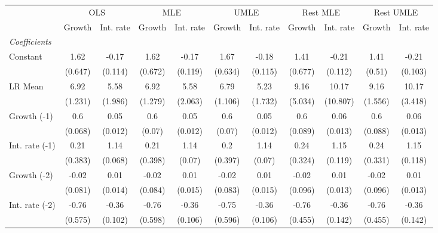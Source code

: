 \begin{table}[htbp] 
	\centering
	\begin{tabular}{@{\extracolsep{4pt}}lcccccccccc@{}}		\hline\hline
		 		 & \multicolumn{2}{c}{OLS} &\multicolumn{2}{c}{MLE} &\multicolumn{2}{c}{UMLE} &\multicolumn{2}{c}{Rest MLE} &\multicolumn{2}{c}{Rest UMLE} \\ 
 		 & Growth 	 & Int. rate 	 & Growth 	 & Int. rate 	 & Growth 	 & Int. rate 	 & Growth 	 & Int. rate 	 & Growth 	 & Int. rate\\\cline{2-3}\cline{4-5}\cline{6-7}\cline{8-9}\cline{10-11}
\rule{0pt}{4ex} 
 \emph{Coefficients} 	  		 & 		 & 		 & 		 & 		 & 		 & 		 & 		 & 		 & 		 &\\ 
\quad Constant 	 & 1.62 	 & -0.17 	 & 1.62 	 & -0.17 	 & 1.67 	 & -0.18 	 & 1.41 	 & -0.21 	 & 1.41 	 & -0.21	 \\ 
 		 & (0.647) 	 & (0.114) 	 & (0.672) 	 & (0.119) 	 & (0.634) 	 & (0.115) 	 & (0.677) 	 & (0.112) 	 & (0.51) 	 & (0.103) 	 \\ 
\quad LR Mean 	 & 6.92 	 & 5.58 	 & 6.92 	 & 5.58 	 & 6.79 	 & 5.23 	 & 9.16 	 & 10.17 	 & 9.16 	 & 10.17	 \\ 
 		 & (1.231) 	 & (1.986) 	 & (1.279) 	 & (2.063) 	 & (1.106) 	 & (1.732) 	 & (5.034) 	 & (10.807) 	 & (1.556) 	 & (3.418) 	 \\ 
\quad Growth (-1) 	 &0.6 	 & 0.05 	 & 0.6 	 & 0.05 	 & 0.6 	 & 0.05 	 & 0.6 	 & 0.06 	 & 0.6 	 & 0.06	 \\ 
 		 & (0.068) 	 & (0.012) 	 & (0.07) 	 & (0.012) 	 & (0.07) 	 & (0.012) 	 & (0.089) 	 & (0.013) 	 & (0.088) 	 & (0.013) 	 \\ 
\quad Int. rate (-1) 	 &0.21 	 & 1.14 	 & 0.21 	 & 1.14 	 & 0.2 	 & 1.14 	 & 0.24 	 & 1.15 	 & 0.24 	 & 1.15	 \\ 
 		 & (0.383) 	 & (0.068) 	 & (0.398) 	 & (0.07) 	 & (0.397) 	 & (0.07) 	 & (0.324) 	 & (0.119) 	 & (0.331) 	 & (0.118) 	 \\ 
\quad Growth (-2) 	 &-0.02 	 & 0.01 	 & -0.02 	 & 0.01 	 & -0.02 	 & 0.01 	 & -0.02 	 & 0.01 	 & -0.02 	 & 0.01	 \\ 
 		 & (0.081) 	 & (0.014) 	 & (0.084) 	 & (0.015) 	 & (0.083) 	 & (0.015) 	 & (0.096) 	 & (0.013) 	 & (0.096) 	 & (0.013) 	 \\ 
\quad Int. rate (-2) 	 &-0.76 	 & -0.36 	 & -0.76 	 & -0.36 	 & -0.75 	 & -0.36 	 & -0.76 	 & -0.36 	 & -0.76 	 & -0.36	 \\ 
 		 & (0.575) 	 & (0.102) 	 & (0.598) 	 & (0.106) 	 & (0.596) 	 & (0.106) 	 & (0.455) 	 & (0.142) 	 & (0.455) 	 & (0.142) 	 \\ 

\end{tabular}
\end{table}
